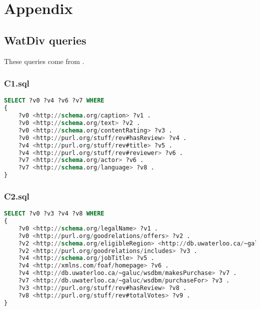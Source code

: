 \documentclass[titlepage, a4paper, 12pt] {article}
\begin{document}
\clearpage

\section{Appendix}

%		


\subsection{WatDiv queries}\label{watdiv}

These queries come from \cite{DBLP:journals/vldb/PengZO0Z16}.

\subsubsection{C1.sql}

\begin{lstlisting}[language=SQL] 
SELECT ?v0 ?v4 ?v6 ?v7 WHERE 
{
	?v0 <http://schema.org/caption> ?v1 .
	?v0 <http://schema.org/text> ?v2 .
	?v0 <http://schema.org/contentRating> ?v3 .
	?v0 <http://purl.org/stuff/rev#hasReview> ?v4 .
	?v4 <http://purl.org/stuff/rev#title> ?v5 .
	?v4 <http://purl.org/stuff/rev#reviewer> ?v6 .
	?v7 <http://schema.org/actor> ?v6 .
	?v7 <http://schema.org/language> ?v8 .
}
\end{lstlisting} 

\subsubsection{C2.sql}

\begin{lstlisting}[language=SQL] 
SELECT ?v0 ?v3 ?v4 ?v8 WHERE 
{
	?v0 <http://schema.org/legalName> ?v1 .
	?v0 <http://purl.org/goodrelations/offers> ?v2 .
	?v2 <http://schema.org/eligibleRegion> <http://db.uwaterloo.ca/~galuc/wsdbm/Country5> .
	?v2 <http://purl.org/goodrelations/includes> ?v3 .
	?v4 <http://schema.org/jobTitle> ?v5 .
	?v4 <http://xmlns.com/foaf/homepage> ?v6 .
	?v4 <http://db.uwaterloo.ca/~galuc/wsdbm/makesPurchase> ?v7 .
	?v7 <http://db.uwaterloo.ca/~galuc/wsdbm/purchaseFor> ?v3 .
	?v3 <http://purl.org/stuff/rev#hasReview> ?v8 .
	?v8 <http://purl.org/stuff/rev#totalVotes> ?v9 .
}
\end{lstlisting}
\end{document}
